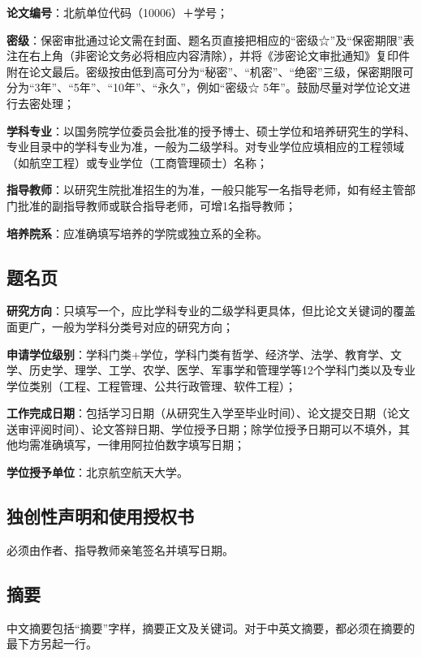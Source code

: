 {\bfseries 论文编号}：北航单位代码（10006）＋学号；

{\bfseries 密级}：保密审批通过论文需在封面、题名页直接把相应的“密级☆”及“保密期限”表注在右上角（非密论文务必将相应内容清除），并将《涉密论文审批通知》复印件附在论文最后。密级按由低到高可分为“秘密”、“机密”、“绝密”三级，保密期限可分为“3年”、“5年”、“10年”、“永久”，例如“密级☆ 5年”。鼓励尽量对学位论文进行去密处理；

{\bfseries 学科专业}：以国务院学位委员会批准的授予博士、硕士学位和培养研究生的学科、专业目录中的学科专业为准，一般为二级学科。对专业学位应填相应的工程领域（如航空工程）或专业学位（工商管理硕士）名称；

{\bfseries 指导教师}：以研究生院批准招生的为准，一般只能写一名指导老师，如有经主管部门批准的副指导教师或联合指导老师，可增1名指导教师；

{\bfseries 培养院系}：应准确填写培养的学院或独立系的全称。

\subsection{题名页}

{\bfseries 研究方向}：只填写一个，应比学科专业的二级学科更具体，但比论文关键词的覆盖面更广，一般为学科分类号对应的研究方向；

{\bfseries 申请学位级别}：学科门类+学位，学科门类有哲学、经济学、法学、教育学、文学、历史学、理学、工学、农学、医学、军事学和管理学等12个学科门类以及专业学位类别（工程、工程管理、公共行政管理、软件工程）；

{\bfseries 工作完成日期}：包括学习日期（从研究生入学至毕业时间）、论文提交日期（论文送审评阅时间）、论文答辩日期、学位授予日期；除学位授予日期可以不填外，其他均需准确填写，一律用阿拉伯数字填写日期；

{\bfseries 学位授予单位}：北京航空航天大学。

\subsection{独创性声明和使用授权书}

必须由作者、指导教师亲笔签名并填写日期。

\subsection{摘要}

中文摘要包括“摘要”字样，摘要正文及关键词。对于中英文摘要，都必须在摘要的最下方另起一行。

